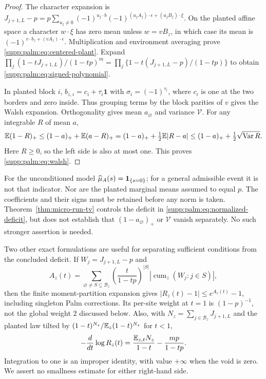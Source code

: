 \begin{proof}
The character expansion is
$J_{j+1,L}-p=p\sum_{u_j\ne0}(-1)^{u_j\cdot b}
 (-1)^{(u_jA_j)\cdot\epsilon+(u_jB_j)\cdot\xi}$.
On the planted affine space a character $w\cdot\xi$ has zero mean unless
$w=vB_z$, in which case its mean is
$(-1)^{v\cdot b_z+(vA_z)\cdot\epsilon}$.
Multiplication and environment averaging prove \eqref{supp:palm:eq:centered-plant}.
Expand
$\prod_j(1-tJ_{j+1,L})/(1-tp)^m
 =\prod_j\{1-t(J_{j+1,L}-p)/(1-tp)\}$ to obtain
\eqref{supp:palm:eq:signed-polynomial}.

In planted block $i$, $b_{z,i}=c_i+\tau_i\mathbf1$ with
$\sigma_i=(-1)^{\tau_i}$, where $c_i$ is one at the two borders and zero inside. Thus grouping terms by the block parities of $v$ gives the Walsh expansion. Orthogonality gives mean $a_\varnothing$ and variance $\mathcal V$.
For any integrable $R$ of mean $a$,
\[
 \mathbb E(1-R)_+\le(1-a)_++\mathbb E(a-R)_+
       =(1-a)_++\tfrac12\mathbb E|R-a|
       \le(1-a)_++\tfrac12\sqrt{\operatorname{Var} R}.
\]
Here $R\ge0$, so the left side is also at most one. This proves \eqref{supp:palm:eq:walsh}.
\end{proof}
For the unconditioned model $\widehat\mu_A(s)=\mathbf 1_{\{s=0\}}$; for a general admissible event it is not that indicator. Nor are the planted marginal means assumed to equal $p$. The coefficients and their signs must be retained before any norm is taken. Theorem~\ref{thm:micro-run-tv} controls the deficit in \eqref{supp:palm:eq:normalized-deficit}, but does not establish that
$(1-a_\varnothing)_+$ or $\mathcal V$ vanish separately. No such stronger assertion is needed.

Two other exact formulations are useful for separating sufficient conditions from the concluded deficit. If $W_j=J_{j+1,L}-p$ and
\[
 A_z(t)=\sum_{\varnothing\ne S\subseteq\mathcal B_z}
       \left(\frac{t}{1-tp}\right)^{|S|}
         |\operatorname{cum}_z(W_j:j\in S)|,
\]
then the finite moment-partition expansion gives
$|R_z(t)-1|\le e^{A_z(t)}-1$, including singleton Palm corrections.
Its per-site weight at $t=1$ is $(1-p)^{-1}$, not the global weight $2$ discussed below.
Also, with $N_z=\sum_{j\in\mathcal B_z}J_{j+1,L}$ and the planted law tilted by
$(1-t)^{N_z}/\mathbb E_z(1-t)^{N_z}$ for $t<1$,
\[
 -\frac{d}{dt}\log R_z(t)
     =\frac{\mathbb E_{z,t}N_z}{1-t}-\frac{mp}{1-tp}.
\]
Integration to one is an improper identity, with value $+\infty$ when the void is zero. We assert no smallness estimate for either right-hand side.

